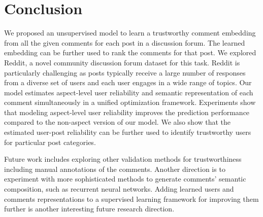 \section{Conclusion} \label{sec:conclusion}
We proposed an unsupervised model to learn a trustworthy comment embedding from all the given comments for each post in a discussion forum. The learned embedding can be further used to rank the comments for that post. We explored Reddit, a novel community discussion forum dataset for this task. Reddit is particularly challenging as posts typically receive a large number of responses from a diverse set of users and each user engages in a wide range of topics.
Our model estimates aspect-level user reliability and semantic representation of each comment simultaneously in a unified optimization framework. Experiments show that modeling aspect-level user reliability improves the prediction performance compared to the non-aspect version of our model. We also show that the estimated user-post reliability can be further used to identify trustworthy users for particular post categories.

Future work includes exploring other validation methods for trustworthiness including manual annotations of the comments. Another direction is to experiment with more sophisticated methods to generate comments' semantic composition, such as recurrent neural networks. Adding learned users and comments representations to a supervised learning framework for improving them further is another interesting future research direction.
